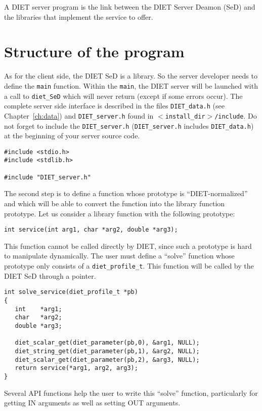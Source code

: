 A DIET server program is the link between the DIET Server Deamon
(SeD) and the libraries that implement the service to offer.

\section{Structure of the program}
\label{sec:sv_struct}

As for the client side, the DIET SeD is a library. So the server
developer needs to define the \texttt{main} function. Within the
\texttt{main}, the DIET server will be launched with a call to
\texttt{diet\_SeD} which will never return (except if some errors
occur). The complete server side interface is described in the files
\texttt{DIET\_data.h} (see Chapter~\ref{ch:data}) and \texttt{DIET\_server.h}
found in \texttt{$<$install\_dir$>$/include}. Do not forget to
include the \texttt{DIET\_server.h} (\texttt{DIET\_server.h}
includes \texttt{DIET\_data.h}) at the beginning of your server
source code.

{\footnotesize
\begin{verbatim}
#include <stdio.h>
#include <stdlib.h>

#include "DIET_server.h"
\end{verbatim}
}

The second step is to define a function whose prototype is ``DIET-normalized''
and which will be able to convert the function into the library function prototype.
Let us consider a library function with the following prototype:
{\footnotesize
\begin{verbatim}
int service(int arg1, char *arg2, double *arg3);
\end{verbatim}
}

This function cannot be called directly by DIET, since such a prototype is hard
to manipulate dynamically. The user must define a ``solve'' function whose
prototype only consists of a \texttt{diet\_profile\_t}.
This function will be called by the DIET SeD through a pointer.
{\footnotesize
\begin{verbatim}
int solve_service(diet_profile_t *pb)
{
   int    *arg1;
   char   *arg2;
   double *arg3;

   diet_scalar_get(diet_parameter(pb,0), &arg1, NULL);
   diet_string_get(diet_parameter(pb,1), &arg2, NULL);
   diet_scalar_get(diet_parameter(pb,2), &arg3, NULL);
   return service(*arg1, arg2, arg3);
}
\end{verbatim}
}

Several API functions help the user to write this ``solve''
function, particularly for getting IN arguments as well as setting
OUT arguments.

